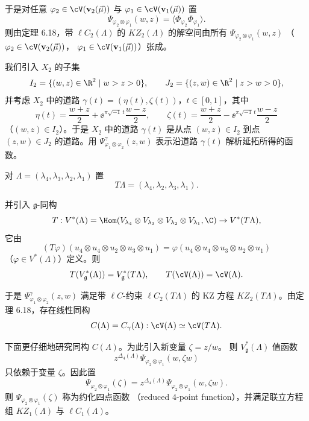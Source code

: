 于是对任意 $\varphi_2\in\cV(\mathbf{v}_2(\vec{\mu}))$ 与
$\varphi_1\in\cV(\mathbf{v}_1(\vec{\mu}))$ 置
\[
\Psi_{\varphi_2\otimes\varphi_1}(w,z)
=\langle\Phi_{\varphi_2}\Phi_{\varphi_1}\rangle .
\]
则由定理 6.18，带 $\ell C_2(\Lambda)$ 的 $KZ_2(\Lambda)$ 的解空间由所有
$\Psi_{\varphi_2\otimes\varphi_1}(w,z)$
（$\varphi_2\in\cV(\mathbf{v}_2(\vec{\mu}))$，
$\varphi_1\in\cV(\mathbf{v}_1(\vec{\mu}))$）张成。

我们引入 $X_2$ 的子集
\[
I_2=\{(w,z)\in\R^2\mid w>z>0\},\qquad
J_2=\{(z,w)\in\R^2\mid z>w>0\},
\]
并考虑 $X_2$ 中的道路 $\gamma(t)=(\eta(t),\zeta(t))$，$t\in[0,1]$，其中
\[
\eta(t)=\frac{w+z}{2}+\ee^{\pi\sqrt{-1}\,t}\frac{w-z}{2},\qquad
\zeta(t)=\frac{w+z}{2}-\ee^{\pi\sqrt{-1}\,t}\frac{w-z}{2}
\]
（$(w,z)\in I_2$）。于是 $X_2$ 中的道路 $\gamma(t)$ 是从点
$(w,z)\in I_2$ 到点 $(z,w)\in J_2$ 的道路。用
$\Psi^{\gamma}_{\varphi_1\otimes\varphi_2}(z,w)$ 表示沿道路 $\gamma(t)$
解析延拓所得的函数。


对 $\Lambda=(\lambda_4,\lambda_3,\lambda_2,\lambda_1)$ 置
\[
T\Lambda=(\lambda_4,\lambda_2,\lambda_3,\lambda_1).
\]


并引入 $\mathfrak{g}$-同构
\[
T:V^{*}(\Lambda)=\Hom(V_{\lambda_4}\otimes V_{\lambda_3}\otimes
V_{\lambda_2}\otimes V_{\lambda_1},\C)\to V^{*}(T\Lambda),
\]
它由
\[
(T\varphi)(u_4\otimes u_4\otimes u_2\otimes u_3\otimes u_1)
=\varphi(u_4\otimes u_4\otimes u_3\otimes u_2\otimes u_1)
\]
（$\varphi\in V^{*}(\Lambda)$）定义。则
\[
T(V^{*}_{\mathfrak{g}}(\Lambda))=V^{*}_{\mathfrak{g}}(T\Lambda),\qquad
T(\cV(\Lambda))=\cV(\Lambda).
\]

于是 $\Psi^{\gamma}_{\varphi_1\otimes\varphi_2}(z,w)$ 满足带 $\ell C$-约束
$\ell C_2(T\Lambda)$ 的 KZ 方程 $KZ_2(T\Lambda)$。由定理 6.18，存在线性同构
\[
C(\Lambda)=C_\gamma(\Lambda):\cV(\Lambda)\simeq\cV(T\Lambda).
\]

下面更仔细地研究同构 $C(\Lambda)$。为此引入新变量 $\zeta=z/w$。
则 $V^{*}_{\mathfrak{g}}(\Lambda)$ 值函数
\[
z^{\Delta_4(\Lambda)}\Psi_{\varphi_2\otimes\varphi_1}(w,\zeta w)
\]
只依赖于变量 $\zeta$。因此置
\[
\Psi_{\varphi_2\otimes\varphi_1}(\zeta)
=z^{\Delta_4(\Lambda)}\Psi_{\varphi_2\otimes\varphi_1}(w,\zeta w).
\]
则 $\Psi_{\varphi_2\otimes\varphi_1}(\zeta)$ 称为约化四点函数
（reduced $4$-point function），并满足联立方程组 $KZ_1(\Lambda)$ 与
$\ell C_1(\Lambda)$。

